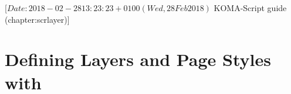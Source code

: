%
%
%
%
%
%
%
%
% 
%
%
%
%

                 [$Date: 2018-02-28 13:23:23 +0100 (Wed, 28 Feb 2018) $
                  KOMA-Script guide (chapter:scrlayer)]



\chapter[{Defining Layers and Page Styles with \Package{scrlayer}}]
  {Defining Layers and Page Styles with
	}

